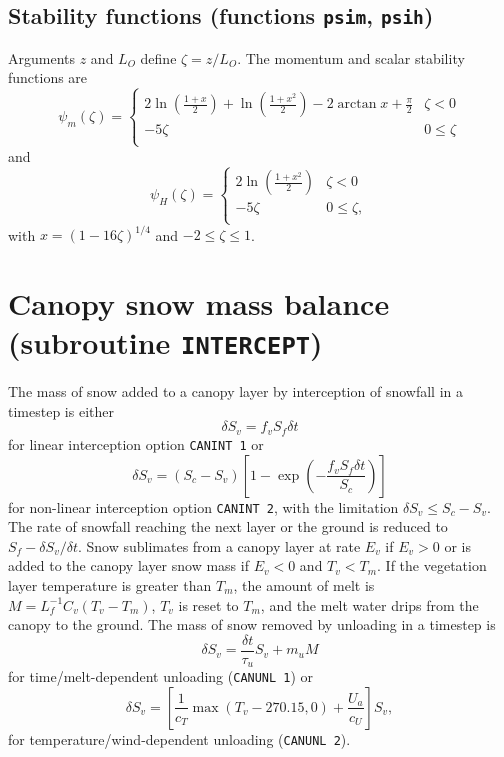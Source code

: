 \documentclass[fleqn]{article}
\begin{document}
\subsection{Stability functions (functions {\tt psim}, {\tt psih})}
Arguments $z$ and $L_O$ define $\zeta = z/L_O$. The momentum and scalar stability functions are
\begin{equation}
\psi_m(\zeta) = 
\begin{cases}
    2\ln\left(\frac{1+x}{2}\right) + \ln\left(\frac{1+x^2}{2}\right) 
    - 2\arctan x + \frac{\pi}{2}    & \zeta<0 \\
    -5\zeta                          &  0 \leq \zeta \\
\end{cases}
\end{equation}
and
\begin{equation}
\psi_H(\zeta) = 
\begin{cases}
    2\ln\left(\frac{1+x^2}{2}\right) & \zeta<0 \\
    -5\zeta                          &  0 \leq \zeta, \\
\end{cases}
\end{equation}
with $x = (1 - 16\zeta)^{1/4}$ and $-2 \leq\zeta\leq 1$. 

\section{Canopy snow mass balance (subroutine {\tt INTERCEPT})}

The mass of snow added to a canopy layer by interception of snowfall in a timestep is either
\begin{equation}
\delta S_v = f_vS_f\delta t
\end{equation}
for linear interception option {\tt CANINT 1} or
\begin{equation}
\delta S_v = (S_c - S_v)\left[1 - \exp\left(-\frac{f_vS_f\delta t}{S_c}\right)\right]
\end{equation}
for non-linear interception option {\tt CANINT 2}, with the limitation $\delta S_v \leq S_c - S_v$.
The rate of snowfall reaching the next layer or the ground is reduced to $S_f - \delta S_v/\delta t$. Snow sublimates from a canopy layer at rate $E_v$ if $E_v>0$ or is added to the canopy layer snow mass if $E_v<0$ and $T_v<T_m$. If the vegetation layer temperature is greater than $T_m$, the amount of melt is $M = L_f^{-1}C_v(T_v - T_m)$, $T_v$ is reset to $T_m$, and the melt water drips from the canopy to the ground. The mass of snow removed by unloading in a timestep is
\begin{equation}
\delta S_v = \frac{\delta t}{\tau_u}S_v + m_uM
\end{equation}
for time/melt-dependent unloading ({\tt CANUNL 1}) or
\begin{equation}
\delta S_v = \left[\frac{1}{c_T}\max(T_v-270.15, 0) + \frac{U_a}{c_U}\right]S_v,
\end{equation}
for temperature/wind-dependent unloading ({\tt CANUNL 2}).
\end{document}
